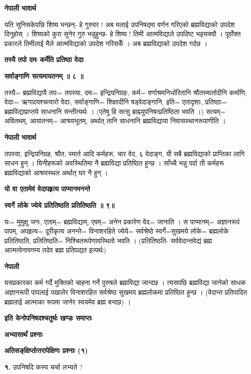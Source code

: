 \documentclass[11pt, a5paper]{article}
\begin{document}
\textbf{नेपाली भावार्थ}

यति सुनिसकेपछि शिष्य भन्छन्- हे गुरुवर ! अब मलाई उपनिषद्‌मा वर्णन गरिएको ब्रह्मविद्याको उपदेश दिनुहोस् । शिष्यको कुरा सुनेर गुरु भन्नुहुन्छ- हे शिष्य ! तिमी  आत्मविद्याले उपदिष्ट भइसक्यौ । पूर्वोक्त प्रकारले तिमीलाई मैले आत्मविद्याको उपदेश गरिसकेँ । अब ब्रह्मविद्याको उपदेश गर्दछ ।

\textbf{तस्यै तपो दमः कर्मेति प्रतिष्ठा वेदाः}

\textbf{सर्वाङ्गाणि सत्यमायतनम् ॥ ८ ॥}

तस्यै= ब्रह्मविद्यायै तपः= तपस्या, दमः= इन्द्रियनिग्रहः, कर्म= वर्णाश्रमनिर्धारितानि श्रौतस्मार्तादीनि कर्माणि, वेदाः= ऋगादयश्चत्वारो वेदाः, सर्वाङ्गाणि= शिक्षादीनि षड्‌वेदाङ्गानि, इति= एतादृशाः, प्रतिष्ठाः= ब्रह्मविद्याप्राप्तये साधनानि सन्तीत्यर्थः । (एतेषु हि सत्सु ब्राह्म्युपनिषत्प्रतिष्ठिता भवति ।) सत्यम्= अवितथम्, आयातनम्= आश्रयभूतम्, अर्थात् तानि साधनानि ब्रह्मविद्याया निवासस्थानरूपाणीति ।

\textbf{नेपाली भावार्थ}

तपस्या, इन्द्रियनिग्रह, श्रौत, स्मार्त आदि कर्महरू, चार वेद, ६ वेदाङ्ग, यी सबै ब्रह्मविद्याको प्राप्तिका लागि साधन हुन् । यिनीहरूको अवस्थितिमा नै ब्रह्मविद्या प्रतिष्ठित हुन्छ । साँच्चै भन्नु पर्दा ती कर्महरू ब्रह्मविद्याको आश्रयस्थल अर्थात् घर नै हुन् ।

\textbf{यो वा एतामेवं वेदापहृत्य पाप्मानमनन्ते}

\textbf{स्वर्गे लोके ज्येये प्रतितिष्ठति प्रतितिष्ठति ॥ ९॥}

यः= मुमुक्षु जनः, एताम्= ब्रह्मविद्याम्, एवम्= अनेन प्रकारेण वेद= जानाति । स पाप्मानम्= अज्ञानरूपं पापम्, अपहृत्य= दूरीकृत्य अनन्ते= विनाशरहिते ज्येये= सर्वश्रेष्ठे स्वर्गे=सुखमये लोके= ब्रह्मलोके प्रतितिष्ठति, प्रतितिष्ठति= निश्चितरूपेणावस्थितो भवति । (प्रतितिष्ठति- सर्ववेदान्तवेद्यं ब्रह्म आत्मत्वेनावगम्य तदेव ब्रह्म प्रतिपद्यत इत्यर्थः)

\textbf{नेपाली}

यसप्रकारका कर्म गर्दै मुक्तिको चाहना गर्ने पुरुषले ब्रह्मविद्या जान्दछ । त्यसपछि ब्रह्मविद्या जानेको साधक अज्ञानरूपी पापलाई पखालेर विनाशरहित सर्वश्रेष्ठ सुखमय ब्रह्मलोकमा प्रतिष्ठित हुन्छ । (वेदान्त प्रतिपादित ब्रह्मलाई आत्माका रूपमा जानेर स्वयमेव ब्रह्म बन्दछ) ।

\textbf{इति केनोपनिषदश्चतुर्थः खण्डः समाप्तः}

\textbf{अभ्यासार्थं प्रश्नाः}

\textbf{अतिसङ्‌क्षिप्तोत्तरापेक्षिणः प्रश्नाः (१)}

\textbf{१.} उपनिषदि कस्य चर्चा लभ्यते ?
\end{document}
